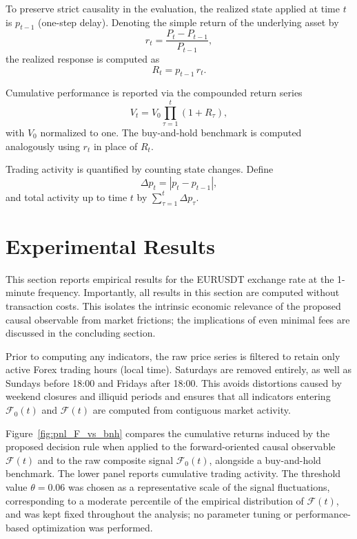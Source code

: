 \documentclass[final,5p,times,twocolumn]{elsarticle}
\begin{document}
To preserve strict causality in the evaluation, the realized state applied at time $t$ is $p_{t-1}$ (one-step delay).
Denoting the simple return of the underlying asset by
\begin{equation}
r_t = \frac{P_t - P_{t-1}}{P_{t-1}},
\end{equation}
the realized response is computed as
\begin{equation}
R_t = p_{t-1}\, r_t.
\label{eq:strategy_return}
\end{equation}

Cumulative performance is reported via the compounded return series
\begin{equation}
V_t = V_0 \prod_{\tau=1}^{t} (1 + R_\tau),
\end{equation}
with $V_0$ normalized to one.
The buy-and-hold benchmark is computed analogously using $r_t$ in place of $R_t$.

Trading activity is quantified by counting state changes. Define
\begin{equation}
\Delta p_t = |p_t - p_{t-1}|,
\end{equation}
and total activity up to time $t$ by $\sum_{\tau=1}^t \Delta p_\tau$.

\section{Experimental Results}
\label{sec:results_eurusdt}

This section reports empirical results for the EURUSDT exchange rate at the 1-minute frequency.
Importantly, all results in this section are computed without transaction costs.
This isolates the intrinsic economic relevance of the proposed causal observable from market frictions; the implications of even minimal fees are discussed in the concluding section.

Prior to computing any indicators, the raw price series is filtered to retain only active Forex trading hours (local time).
Saturdays are removed entirely, as well as Sundays before 18:00 and Fridays after 18:00.
This avoids distortions caused by weekend closures and illiquid periods and ensures that all indicators entering $\mathscr{F}_0(t)$ and $\mathscr{F}(t)$ are computed from contiguous market activity.

Figure~\ref{fig:pnl_F_vs_bnh} compares the cumulative returns induced by the proposed decision rule when applied to the forward-oriented causal observable $\mathscr{F}(t)$ and to the raw composite signal $\mathscr{F}_0(t)$, alongside a buy-and-hold benchmark.
The lower panel reports cumulative trading activity.
The threshold value $\theta = 0.06$ was chosen as a representative scale of the signal fluctuations, corresponding to a moderate percentile of the empirical distribution of $\mathscr{F}(t)$, and was kept fixed throughout the analysis; no parameter tuning or performance-based optimization was performed.
\end{document}
